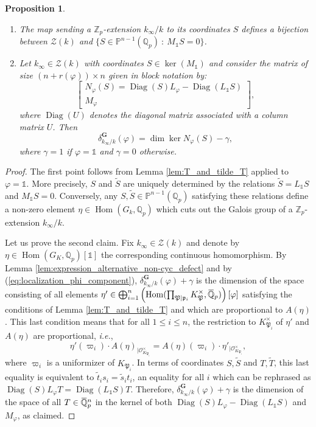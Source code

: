 \documentclass[12pt]{amsart}
\newcommand{\Q}{\mathbb{Q}}
\newcommand\bQ{\mathbb{Q}}
\newcommand\bP{\mathbb{P}}
\newcommand\Zp{{\mathbb{Z}_p}}
\newcommand\Qp{{\mathbb{Q}_p}}
\newcommand\cO{\mathcal{O}}
\newcommand\gp{\mathfrak{p}}
\newcommand\gP{\mathfrak{P}}
\newcommand\sZ{\mathscr{Z}}
\newcommand{\ob}[1]{\mkern 1.5mu\overline{\mkern-1.5mu#1\mkern-1.5mu}\mkern 1.5mu}
\DeclareMathOperator{\Hom}{Hom}
\DeclareMathOperator{\Diag}{Diag}
\theoremstyle{defstyle}
\theoremstyle{thmstyle}
\newtheorem{proposition}[subsubsection]{Proposition}
\begin{document}
	\begin{proposition}\label{prop:prop_clef_non_cyc}
		\begin{enumerate}
			\item The map sending a $\Zp$-extension $k_\infty/k$ to its coordinates $S$ defines a bijection between $\sZ(k)$ and $\{S \in \bP^{n-1}(\Qp) \ \colon \ M_{\mathds{1}}S=0\}$.
			\item Let $k_\infty \in \sZ(k)$ with coordinates $S\in \ker(M_\mathds{1})$ and consider the matrix of size $(n+r(\varphi))\times n$ given in block notation by:
			\begin{equation}\label{eq:def_N_phi_S}
				\begin{bmatrix}
				N_\varphi(S)=\Diag(S)L_\varphi - \Diag(L_\mathds{1}S)\\
				M_\varphi
			\end{bmatrix},
			\end{equation}
			where $\Diag(U)$ denotes the diagonal matrix associated with a column matrix $U$.
			Then $$\delta_{k_\infty/k}^\textbf{G}(\varphi) = \dim \ker N_\varphi(S) - \gamma,$$ 
			where $\gamma=1$ if $\varphi=\mathds{1}$ and $\gamma=0$ otherwise. 
		\end{enumerate}
	\end{proposition}
	\begin{proof}
		The first point follows from Lemma \ref{lem:T_and_tilde_T} applied to $\varphi=\mathds{1}$. More precisely, $S$ and $\tilde{S}$ are uniquely determined by the relations $\tilde{S}=L_{\mathds{1}}S$ and $M_{\mathds{1}}S=0$. Conversely, any $S,\tilde{S} \in \bP^{n-1}(\Qp)$ satisfying these relations define a non-zero element $\eta \in \Hom(G_k,\Qp)$ which cuts out the Galois group of a $\Zp$-extension $k_\infty/k$.
		
		Let us prove the second claim. Fix $k_\infty \in \sZ(k)$ and denote by $\eta\in \Hom(G_K,\Qp)[\mathds{1}]$ the corresponding continuous homomorphism. By Lemma \ref{lem:expression_alternative_non-cyc_defect} and by (\ref{eq:localization_phi_component}), $\delta_{k_\infty/k}^\textbf{G}(\varphi)+\gamma$ is the dimension of the space consisting of all elements $\eta'\in \bigoplus_{i=1}^n \left( \Hom(\prod_{\gP|\gp_i} K^\times_{\gP},\ob{\bQ}_p)\right)[\varphi]$ satisfying the conditions of Lemma \ref{lem:T_and_tilde_T} and which are proportional to $A(\eta)$. This last condition means that for all $1\leq i \leq n$, the restriction to $K_{\gP_i}^\times$ of $\eta'$ and $A(\eta)$ are proportional, \textit{i.e.}, 
		$$\eta'(\varpi_{i})\cdot A(\eta)_{|\cO^\times_{K_{\gP_i}}} = A(\eta)(\varpi_{i})\cdot \eta'_{|\cO^\times_{K_{\gP_i}}},$$
		where $\varpi_{i}$ is a uniformizer of $K_{\gP_i}$.
		In terms of coordinates $S,\tilde{S}$ and $T,\tilde{T}$, this last equality is equivalent to $\tilde{t}_is_i=\tilde{s}_it_i$, an equality for all $i$ which can be rephrased as $\Diag(S)L_{\varphi}T=\Diag(L_\mathds{1}S)T$. Therefore, $\delta_{k_\infty/k}^\textbf{G}(\varphi)+\gamma$ is the dimension of the space of all $T\in \ob{\Q}_p^n$ in the kernel of both $\Diag(S)L_\varphi - \Diag(L_\mathds{1}S)$ and $M_\varphi$, as claimed.
	\end{proof}
	
\end{document}
